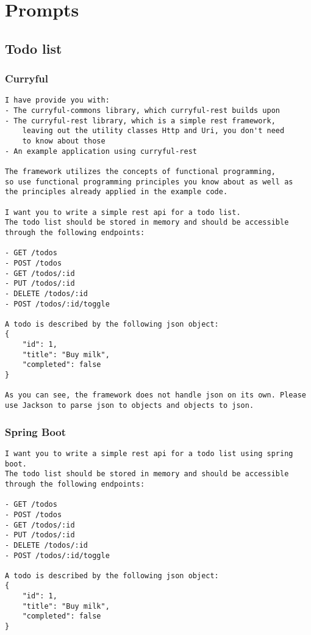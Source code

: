 \documentclass[a4paper,titlepage]{article}
\begin{document}
\newpage
\appendix

\section{Prompts}
\subsection{Todo list}
\subsubsection{Curryful}
\begin{lstlisting}
I have provide you with:
- The curryful-commons library, which curryful-rest builds upon
- The curryful-rest library, which is a simple rest framework,
	leaving out the utility classes Http and Uri, you don't need
	to know about those
- An example application using curryful-rest

The framework utilizes the concepts of functional programming,
so use functional programming principles you know about as well as
the principles already applied in the example code.

I want you to write a simple rest api for a todo list.
The todo list should be stored in memory and should be accessible
through the following endpoints:

- GET /todos
- POST /todos
- GET /todos/:id
- PUT /todos/:id
- DELETE /todos/:id
- POST /todos/:id/toggle

A todo is described by the following json object:
{
	"id": 1,
	"title": "Buy milk",
	"completed": false
}

As you can see, the framework does not handle json on its own. Please
use Jackson to parse json to objects and objects to json.
\end{lstlisting}

\subsubsection{Spring Boot}
\begin{lstlisting}
I want you to write a simple rest api for a todo list using spring boot.
The todo list should be stored in memory and should be accessible
through the following endpoints:

- GET /todos
- POST /todos
- GET /todos/:id
- PUT /todos/:id
- DELETE /todos/:id
- POST /todos/:id/toggle

A todo is described by the following json object:
{
	"id": 1,
	"title": "Buy milk",
	"completed": false
}
\end{lstlisting}
\end{document}
